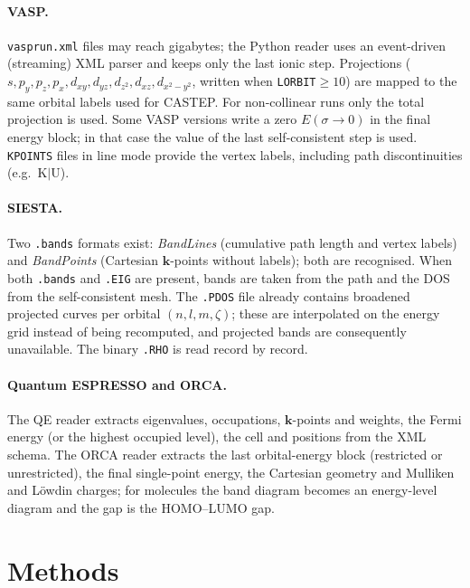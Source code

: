 \documentclass[11pt,a4paper]{article}
\newcommand{\code}[1]{\texttt{#1}}
\begin{document}
\paragraph{VASP.} \code{vasprun.xml} files may reach gigabytes; the Python reader uses an event-driven (streaming) XML parser and keeps only the last ionic step. Projections ($s,p_y,p_z,p_x,d_{xy},d_{yz},d_{z^2},d_{xz},d_{x^2-y^2}$, written when \code{LORBIT}$\geq10$) are mapped to the same orbital labels used for CASTEP. For non-collinear runs only the total projection is used. Some VASP versions write a zero $E(\sigma\!\to\!0)$ in the final energy block; in that case the value of the last self-consistent step is used. \code{KPOINTS} files in line mode provide the vertex labels, including path discontinuities (e.g.\ K$|$U).

\paragraph{SIESTA.} Two \code{.bands} formats exist: \emph{BandLines} (cumulative path length and vertex labels) and \emph{BandPoints} (Cartesian $\bm{k}$-points without labels); both are recognised. When both \code{.bands} and \code{.EIG} are present, bands are taken from the path and the DOS from the self-consistent mesh. The \code{.PDOS} file already contains broadened projected curves per orbital $(n,l,m,\zeta)$; these are interpolated on the energy grid instead of being recomputed, and projected bands are consequently unavailable. The binary \code{.RHO} is read record by record.

\paragraph{Quantum ESPRESSO and ORCA.} The QE reader extracts eigenvalues, occupations, $\bm{k}$-points and weights, the Fermi energy (or the highest occupied level), the cell and positions from the XML schema. The ORCA reader extracts the last orbital-energy block (restricted or unrestricted), the final single-point energy, the Cartesian geometry and Mulliken and Löwdin charges; for molecules the band diagram becomes an energy-level diagram and the gap is the HOMO–LUMO gap.

\section{Methods}\label{sec:methods}
\end{document}
